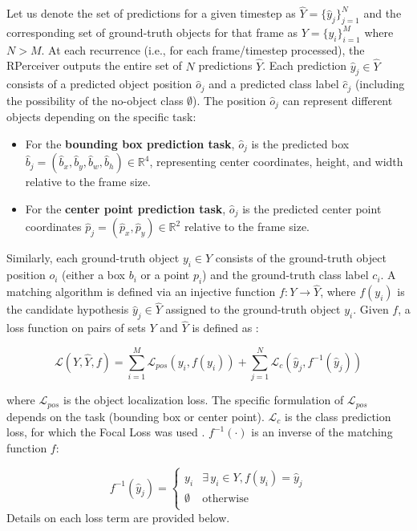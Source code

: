 Let us denote the set of predictions for a given timestep as $ \hat{Y} = \{\hat{y}_j\}_{j=1}^N $ and the corresponding set of ground-truth objects for that frame as $ Y = \{y_i\}_{i=1}^M $ where $ N > M $. At each recurrence (i.e., for each frame/timestep processed), the RPerceiver outputs the entire set of $N$ predictions $\hat{Y}$. Each prediction $\hat{y}_j \in \hat{Y}$ consists of a predicted object position $\hat{o}_j$ and a predicted class label $\hat{c}_j$ (including the possibility of the no-object class $\emptyset$). The position $\hat{o}_j$ can represent different objects depending on the specific task:
\begin{itemize}
    \item For the \textbf{bounding box prediction task}, $\hat{o}_j$ is the predicted box $\hat{b}_j = (\hat{b}_x, \hat{b}_y, \hat{b}_w, \hat{b}_h) \in \mathbb{R}^4$, representing center coordinates, height, and width relative to the frame size.
    \item For the \textbf{center point prediction task}, $\hat{o}_j$ is the predicted center point coordinates $\hat{p}_j = (\hat{p}_x, \hat{p}_y) \in \mathbb{R}^2$ relative to the frame size.
\end{itemize}
Similarly, each ground-truth object $y_i \in Y$ consists of the ground-truth object position $o_i$ (either a box $b_i$ or a point $p_i$) and the ground-truth class label $c_i$.
A matching algorithm is defined via an injective function $f: Y \rightarrow \hat{Y}$, where $f(y_i)$ is the candidate hypothesis $\hat{y}_j \in \hat{Y}$ assigned to the ground-truth object $y_i$. Given $f$, a loss function on pairs of sets $Y$ and $\hat{Y}$ is defined as \cite{stewartEndtoendPeopleDetection2015}:

\begin{equation} \label{eq:set_loss}
\mathcal{L}(Y, \hat{Y}, f ) = \sum_{i=1}^{M} \mathcal{L}_{pos}(y_i, f(y_i)) +  \sum_{j=1}^{N} \mathcal{L}_c (\hat{y}_j, f^{-1}(\hat{y}_j))
\end{equation}

where $\mathcal{L}_{pos}$ is the object localization loss. The specific formulation of $\mathcal{L}_{pos}$ depends on the task (bounding box or center point). $\mathcal{L}_c$ is the class prediction loss, for which the Focal Loss was used \cite{linFocalLossDense2018}. $f^{-1}(\cdot)$ is an inverse of the matching function $f$:

\begin{equation*}
f^{-1}(\hat{y}_j) =
\begin{cases}
y_i & \exists \, y_i \in Y, f(y_i) = \hat{y}_j \\
\emptyset & \text{otherwise} \\
\end{cases}
\end{equation*}
Details on each loss term are provided below.

